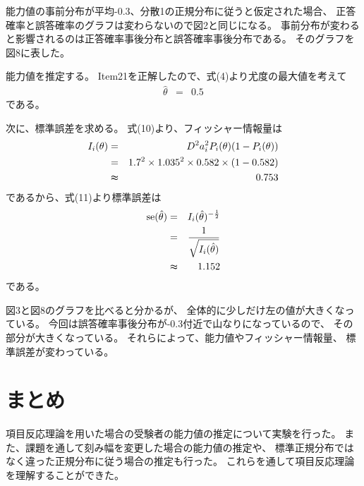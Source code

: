 \documentclass[12pt]{jarticle}
\begin{document}
能力値の事前分布が平均-0.3、分散1の正規分布に従うと仮定された場合、
正答確率と誤答確率のグラフは変わらないので図2と同じになる。
事前分布が変わると影響されるのは正答確率事後分布と誤答確率事後分布である。
そのグラフを図8に表した。

能力値を推定する。
Item21を正解したので、式(4)より尤度の最大値を考えて
\begin{eqnarray}
    \hat{\theta}&=&0.5 \nonumber
\end{eqnarray}
である。

次に、標準誤差を求める。
式(10)より、フィッシャー情報量は
\begin{eqnarray}
    I_i(\theta)&=&D^2a_i^2 P_i(\theta)(1-P_i(\theta)) \nonumber\\
    &=&1.7^2 \times 1.035^2\times 0.582\times (1-0.582) \nonumber\\
    &\thickapprox& 0.753 \nonumber
\end{eqnarray}
であるから、式(11)より標準誤差は
\begin{eqnarray}
    {\rm se}(\hat{\theta})&=&I_i(\hat{\theta})^{-\frac{1}{2}} \nonumber\\
    &=&\frac{1}{\sqrt{I_i(\hat{\theta})}}\nonumber\\
    &\thickapprox&1.152\nonumber
\end{eqnarray}
である。

図3と図8のグラフを比べると分かるが、
全体的に少しだけ左の値が大きくなっている。
今回は誤答確率事後分布が-0.3付近で山なりになっているので、
その部分が大きくなっている。
それらによって、能力値やフィッシャー情報量、
標準誤差が変わっている。


\section{まとめ}
項目反応理論を用いた場合の受験者の能力値の推定について実験を行った。
また、課題を通して刻み幅を変更した場合の能力値の推定や、
標準正規分布ではなく違った正規分布に従う場合の推定も行った。
これらを通して項目反応理論を理解することができた。


\clearpage
\appendix
\end{document}
